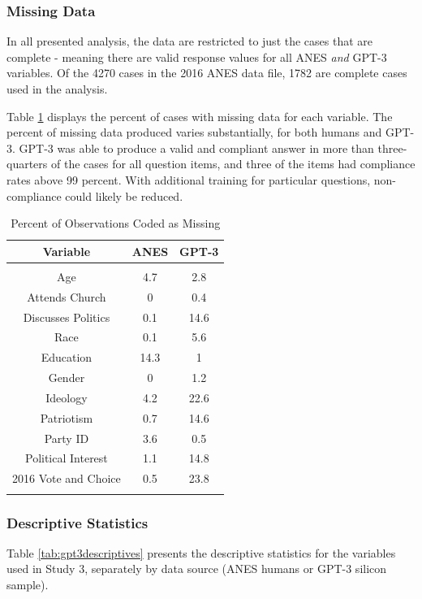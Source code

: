 \documentclass[11pt]{article}
\begin{document}
\subsubsection{Missing Data}
In all presented analysis, the data are restricted to just the cases that are complete - meaning there are valid response values for all ANES \textit{and} GPT-3 variables. Of the 4270 cases in the 2016 ANES data file, 1782 are complete cases used in the analysis.

Table \ref{tab:naproportions} displays the percent of cases with missing data for each variable. The percent of missing data produced varies substantially, for both humans and GPT-3. GPT-3 was able to produce a valid and compliant answer in more than three-quarters of the cases for all question items, and three of the items had compliance rates above 99 percent. With additional training for particular questions, non-compliance could likely be reduced.

\begin{table}[!htbp] \centering

\begin{tabular}{@{\extracolsep{5pt}} ccc}
\toprule{}
 Variable & ANES & GPT-3 \\
\hline \\[-1.8ex]
 Age & 4.7 & 2.8 \\
 Attends Church & 0 & 0.4 \\
 Discusses Politics & 0.1 & 14.6 \\
 Race & 0.1 & 5.6 \\
 Education & 14.3 & 1 \\
 Gender & 0 & 1.2 \\
 Ideology & 4.2 & 22.6 \\
 Patriotism & 0.7 & 14.6 \\
 Party ID & 3.6 & 0.5 \\
 Political Interest & 1.1 & 14.8 \\
 2016 Vote and Choice & 0.5 & 23.8 \\
\bottomrule{}
\end{tabular}
  \caption{Percent of Observations Coded as Missing}
  \label{tab:naproportions}
\end{table}

\subsubsection{Descriptive Statistics}
Table \ref{tab:gpt3descriptives} presents the descriptive statistics for the variables used in Study 3, separately by data source (ANES humans or GPT-3 silicon sample).
\end{document}
